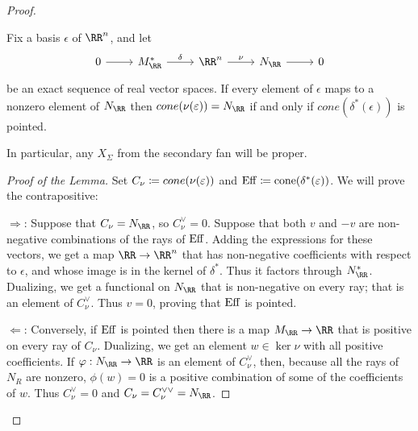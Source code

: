 \documentclass{amsart}
\begin{document}
\begin{proof}
    \begin{lemma}
      Fix a basis $\epsilon$ of $\RR^n$, and let
      $$
      \begin{tikzcd}
        0\arrow{r} &M_\RR^* \arrow{r}{\delta} & \RR^n \arrow{r}{\nu}&N_\RR \arrow{r}&0
      \end{tikzcd}
      $$
      be an exact sequence of real vector spaces. If every element of $\epsilon$ maps
      to a nonzero element of $N_\RR$ then $ cone(\nu(\epsilon)) = N_\RR$
      if and only if $cone(\delta^*(\epsilon))$ is pointed.
    \end{lemma}
    In particular, any $X_{\Sigma}$ from the secondary fan will be proper.

    \begin{proof}[Proof of the Lemma] Set $C_\nu\coloneqq cone(\nu(\varepsilon))$ and
      \def\Eff{\rm Eff}
      $\Eff \ce cone(\delta^*(\epsilon))$. We will prove the contrapositive:

      \noindent $\Rightarrow$: Suppose that $C_\nu = N_\RR$, so $C_\nu^\vee = 0$.
      Suppose that both $v$ and $-v$ are non-negative combinations of the rays
      of $\Eff$. Adding the expressions for these vectors, we get a map $\RR \to \RR^n$ that has non-negative coefficients
      with respect to $\epsilon$, and whose image is in the kernel of $\delta^*$.
      Thus it factors through $N_\RR^*$. Dualizing, we get a functional on
      $N_\RR$ that is non-negative on every ray; that is an element
      of $C_\nu^\vee$. Thus $v = 0$, proving that $\Eff$ is pointed.

      \noindent $\Leftarrow$: Conversely, if $\Eff$ is pointed then there
      is a map $M_\RR \to \RR$ that is positive on every ray of $C_\nu$. Dualizing, we get an
      element $w \in \ker \nu$ with all positive coefficients. If $\phi: N_\RR \to \RR$
      is an element of $C_\nu^\vee$, then, because all the rays of $N_R$ are nonzero, $\phi(w)=0$ is a positive combination of some of the coefficients of $w$. Thus $C_\nu^\vee = 0$ and $C_\nu = C_\nu^{\vee\vee} = N_\RR$.
    \end{proof}


\end{proof}
\end{document}

